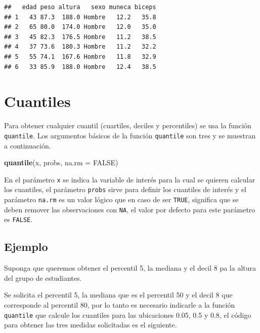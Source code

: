 \documentclass[10pt,]{krantz}
\makeatletter
\newenvironment{Shaded}{\begin{snugshade}}{\end{snugshade}}
\newcommand{\KeywordTok}[1]{\textcolor[rgb]{0.13,0.29,0.53}{\textbf{{#1}}}}
\newcommand{\DataTypeTok}[1]{\textcolor[rgb]{0.13,0.29,0.53}{{#1}}}
\newcommand{\FloatTok}[1]{\textcolor[rgb]{0.00,0.00,0.81}{{#1}}}
\newcommand{\OtherTok}[1]{\textcolor[rgb]{0.56,0.35,0.01}{{#1}}}
\newcommand{\NormalTok}[1]{{#1}}
\newenvironment{kframe}{%
\medskip{}
\setlength{\fboxsep}{.8em}
 \def\at@end@of@kframe{}%
 \ifinner\ifhmode%
  \def\at@end@of@kframe{\end{minipage}}%
  \begin{minipage}{\columnwidth}%
 \fi\fi%
 \def\FrameCommand##1{\hskip\@totalleftmargin \hskip-\fboxsep
 \colorbox{shadecolor}{##1}\hskip-\fboxsep
     \hskip-\linewidth \hskip-\@totalleftmargin \hskip\columnwidth}%
 \MakeFramed {\advance\hsize-\width
   \@totalleftmargin\z@ \linewidth\hsize
   \@setminipage}}%
 {\par\unskip\endMakeFramed%
 \at@end@of@kframe}
\renewenvironment{Shaded}{\begin{kframe}}{\end{kframe}}
\makeatother
\begin{document}
\begin{verbatim}
##   edad peso altura   sexo muneca biceps
## 1   43 87.3  188.0 Hombre   12.2   35.8
## 2   65 80.0  174.0 Hombre   12.0   35.0
## 3   45 82.3  176.5 Hombre   11.2   38.5
## 4   37 73.6  180.3 Hombre   11.2   32.2
## 5   55 74.1  167.6 Hombre   11.8   32.9
## 6   33 85.9  188.0 Hombre   12.4   38.5
\end{verbatim}

\section{\texorpdfstring{Cuantiles  
 
}{Cuantiles     }}\label{cuantiles}

Para obtener cualquier cuantil (cuartiles, deciles y percentiles) se usa
la función \texttt{quantile}. Los argumentos básicos de la función
\texttt{quantile} son tres y se muestran a continuación.

\begin{Shaded}
\begin{Highlighting}[]
\KeywordTok{quantile}\NormalTok{(x, probs, }\DataTypeTok{na.rm =} \OtherTok{FALSE}\NormalTok{)}
\end{Highlighting}
\end{Shaded}

En el parámetro \texttt{x} se indica la variable de interés para la cual
se quieren calcular los cuantiles, el parámetro \texttt{probs} sirve
para definir los cuantiles de interés y el parámetro \texttt{na.rm} es
un valor lógico que en caso de ser \texttt{TRUE}, significa que se deben
remover las observaciones con \texttt{NA}, el valor por defecto para
este parámetro es \texttt{FALSE}.

\subsection*{Ejemplo}\label{ejemplo-42}


Suponga que queremos obtener el percentil 5, la mediana y el decil 8 pa
la altura del grupo de estudiantes.

Se solicita el percentil 5, la mediana que es el percentil 50 y el decil
8 que corresponde al percentil 80, por lo tanto es necesario indicarle a
la función \texttt{quantile} que calcule los cuantiles para las
ubicaciones 0.05, 0.5 y 0.8, el código para obtener las tres medidas
solicitadas es el siguiente.

\begin{Shaded}
\end{Shaded}
\end{document}
